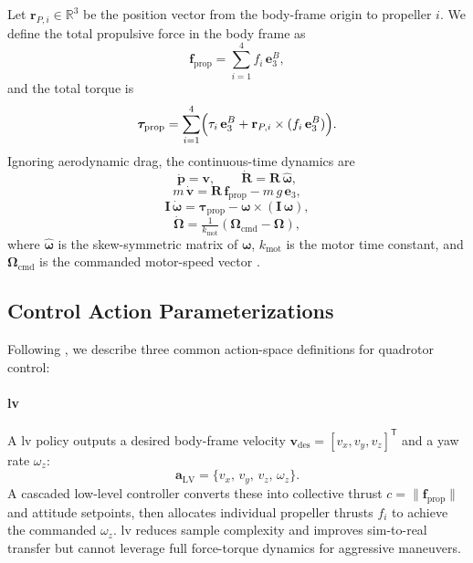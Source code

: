 Let \(\mathbf{r}_{P,i}\in \mathbb{R}^{3}\) be the position vector from the body-frame origin to propeller \(i\). We define the total propulsive force in the body frame as
\begin{equation}
\mathbf{f}_{\mathrm{prop}} = \sum_{i=1}^4 f_i\,\mathbf{e}_3^B,
\end{equation}
and the total torque is
\begin{equation}
\boldsymbol{\tau}_{\mathrm{prop}} = \sum_{i=1}^4 \Bigl(\tau_i\,\mathbf{e}_3^B + \mathbf{r}_{P,i}\times(f_i\,\mathbf{e}_3^B)\Bigr).
\end{equation}
Ignoring aerodynamic drag, the continuous-time dynamics are
\begin{equation}
\dot{\mathbf{p}} = \mathbf{v}, 
\qquad
\dot{\mathbf{R}} = \mathbf{R}\,\widehat{\boldsymbol{\omega}},
\end{equation}
\begin{equation}
m\,\dot{\mathbf{v}} = \mathbf{R}\,\mathbf{f}_{\mathrm{prop}} - m\,g\,\mathbf{e}_3,
\end{equation}
\begin{equation}
\mathbf{I}\,\dot{\boldsymbol{\omega}} = \boldsymbol{\tau}_{\mathrm{prop}} - \boldsymbol{\omega} \times (\mathbf{I}\,\boldsymbol{\omega}),
\end{equation}
\begin{equation}
\dot{\boldsymbol{\Omega}} = \tfrac{1}{k_{\mathrm{mot}}}(\boldsymbol{\Omega}_{\mathrm{cmd}} - \boldsymbol{\Omega}),
\end{equation}
where \(\widehat{\boldsymbol{\omega}}\) is the skew-symmetric matrix of \(\boldsymbol{\omega}\), \(k_{\mathrm{mot}}\) is the motor time constant, and \(\boldsymbol{\Omega}_{\mathrm{cmd}}\) is the commanded motor-speed vector \cite{kaufmann_benchmark_2022}.

\subsection{Control Action Parameterizations}
\label{sec:quadrotor_actions}
Following \cite{kaufmann_benchmark_2022}, we describe three common action-space definitions for quadrotor control:

\paragraph{\gls{lv}}  
A \gls{lv} policy outputs a desired body-frame velocity \(\mathbf{v}_{\mathrm{des}}=[v_x,v_y,v_z]^\mathsf{T}\) and a yaw rate \(\omega_z\):
\begin{equation}
\mathbf{a}_{\mathrm{LV}} = \{v_x,\,v_y,\,v_z,\,\omega_z\}.
\end{equation}
A cascaded low-level controller converts these into collective thrust \(c=\|\mathbf{f}_{\mathrm{prop}}\|\) and attitude setpoints, then allocates individual propeller thrusts \(f_i\) to achieve the commanded \(\omega_z\). \gls{lv} reduces sample complexity and improves sim-to-real transfer but cannot leverage full force-torque dynamics for aggressive maneuvers.

